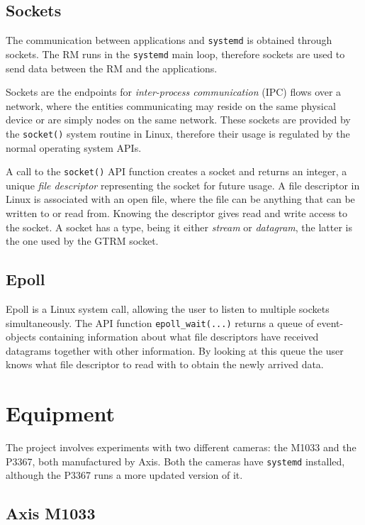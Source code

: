 \documentclass[nobiblatex]{LTHthesis}
\begin{document}
\subsection{Sockets}
The communication between applications and \texttt{systemd} is obtained
through sockets. The RM runs in the \texttt{systemd} main loop, therefore
sockets are used to send data between the RM and the applications.

Sockets are the endpoints for \emph{inter-process communication} (IPC) 
flows over a network, where the entities communicating may reside on the
same physical device or are simply nodes on the same network. These sockets
are provided by the \texttt{socket()} system routine in Linux, therefore
their usage is regulated by the normal operating system APIs.

A call to the \texttt{socket()} API function creates a socket and returns 
an integer, a unique \emph{file descriptor} representing the socket for
future usage. A file descriptor in Linux is associated with an open file,
where the file can be anything that can be written to or read from. 
Knowing the descriptor gives read and write access to the socket. 
A socket has a type, being it either \emph{stream} or \emph{datagram}, 
the latter is the one used by the GTRM socket.


\subsection{Epoll}
Epoll is a Linux system call, allowing the user to listen to multiple 
sockets simultaneously. The API function \texttt{epoll\_wait(...)} returns 
a queue of event-objects containing information about what file descriptors
have received datagrams together with other information. By looking at this 
queue the user knows what file descriptor to read with to obtain the newly
arrived data.  

\section{Equipment}
The project involves experiments with two different cameras: the M1033 and 
the P3367, both manufactured by Axis. Both the cameras have \texttt{systemd}
installed, although the P3367 runs a more updated version of it.

\subsection{Axis M1033}
\end{document}
